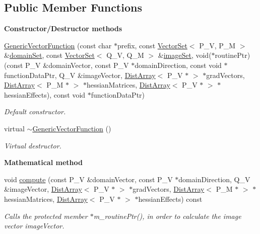 \subsection*{Public Member Functions}
\begin{Indent}{\bf Constructor/\-Destructor methods}\par
\begin{DoxyCompactItemize}
\item 
\hyperlink{class_q_u_e_s_o_1_1_generic_vector_function_a7225557182bd694de55618dff4322d3a}{Generic\-Vector\-Function} (const char $\ast$prefix, const \hyperlink{class_q_u_e_s_o_1_1_vector_set}{Vector\-Set}$<$ P\-\_\-\-V, P\-\_\-\-M $>$ \&\hyperlink{class_q_u_e_s_o_1_1_base_vector_function_af77b709d473f253e5c56aa620d5f3cb0}{domain\-Set}, const \hyperlink{class_q_u_e_s_o_1_1_vector_set}{Vector\-Set}$<$ Q\-\_\-\-V, Q\-\_\-\-M $>$ \&\hyperlink{class_q_u_e_s_o_1_1_base_vector_function_aa3a070a86f7099f53a669f1aab547619}{image\-Set}, void($\ast$routine\-Ptr)(const P\-\_\-\-V \&domain\-Vector, const P\-\_\-\-V $\ast$domain\-Direction, const void $\ast$function\-Data\-Ptr, Q\-\_\-\-V \&image\-Vector, \hyperlink{class_q_u_e_s_o_1_1_dist_array}{Dist\-Array}$<$ P\-\_\-\-V $\ast$ $>$ $\ast$grad\-Vectors, \hyperlink{class_q_u_e_s_o_1_1_dist_array}{Dist\-Array}$<$ P\-\_\-\-M $\ast$ $>$ $\ast$hessian\-Matrices, \hyperlink{class_q_u_e_s_o_1_1_dist_array}{Dist\-Array}$<$ P\-\_\-\-V $\ast$ $>$ $\ast$hessian\-Effects), const void $\ast$function\-Data\-Ptr)
\begin{DoxyCompactList}\small\item\em Default constructor. \end{DoxyCompactList}\item 
virtual \hyperlink{class_q_u_e_s_o_1_1_generic_vector_function_ab125a1b6d18f7912e70d19bd80f72175}{$\sim$\-Generic\-Vector\-Function} ()
\begin{DoxyCompactList}\small\item\em Virtual destructor. \end{DoxyCompactList}\end{DoxyCompactItemize}
\end{Indent}
\begin{Indent}{\bf Mathematical method}\par
\begin{DoxyCompactItemize}
\item 
void \hyperlink{class_q_u_e_s_o_1_1_generic_vector_function_afcc099493262b90cdace65f24bb6b98d}{compute} (const P\-\_\-\-V \&domain\-Vector, const P\-\_\-\-V $\ast$domain\-Direction, Q\-\_\-\-V \&image\-Vector, \hyperlink{class_q_u_e_s_o_1_1_dist_array}{Dist\-Array}$<$ P\-\_\-\-V $\ast$ $>$ $\ast$grad\-Vectors, \hyperlink{class_q_u_e_s_o_1_1_dist_array}{Dist\-Array}$<$ P\-\_\-\-M $\ast$ $>$ $\ast$hessian\-Matrices, \hyperlink{class_q_u_e_s_o_1_1_dist_array}{Dist\-Array}$<$ P\-\_\-\-V $\ast$ $>$ $\ast$hessian\-Effects) const 
\begin{DoxyCompactList}\small\item\em Calls the protected member {\ttfamily $\ast$m\-\_\-routine\-Ptr}(), in order to calculate the image vector {\ttfamily image\-Vector}. \end{DoxyCompactList}\end{DoxyCompactItemize}
\end{Indent}

